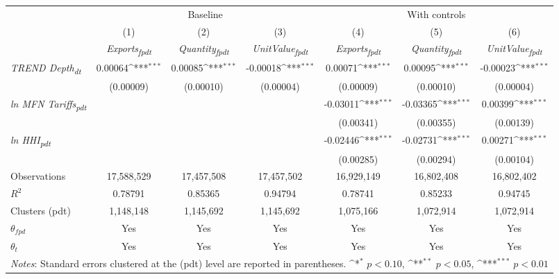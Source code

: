 {
\def\sym#1{\ifmmode^{#1}\else\(^{#1}\)\fi}
\begin{tabular}{l*{6}{c}}
\toprule
&\multicolumn{3}{c}{Baseline}&\multicolumn{3}{c}{With controls}\\\cmidrule(lr){2-4}\cmidrule(lr){5-7}
&(1)&(2)&(3)&(4)&(5)&(6)\\
&\textit{Exports\textsubscript{fpdt}}&\textit{Quantity\textsubscript{fpdt}}&\textit{UnitValue\textsubscript{fpdt}}&\textit{Exports\textsubscript{fpdt}}&\textit{Quantity\textsubscript{fpdt}}&\textit{UnitValue\textsubscript{fpdt}}\\
\midrule
\textit{TREND Depth\textsubscript{dt}} & 0.00064\sym{***} & 0.00085\sym{***} & -0.00018\sym{***} & 0.00071\sym{***} & 0.00095\sym{***} & -0.00023\sym{***}\\
 & (0.00009) & (0.00010) & (0.00004) & (0.00009) & (0.00010) & (0.00004)\\
\addlinespace
\textit{ln MFN Tariffs\textsubscript{pdt}} &  &  &  & -0.03011\sym{***} & -0.03365\sym{***} & 0.00399\sym{***}\\
 &  &  &  & (0.00341) & (0.00355) & (0.00139)\\
\addlinespace
\textit{ln HHI\textsubscript{pdt}} &  &  &  & -0.02446\sym{***} & -0.02731\sym{***} & 0.00271\sym{***}\\
 &  &  &  & (0.00285) & (0.00294) & (0.00104)\\
\midrule
Observations & 17,588,529 & 17,457,508 & 17,457,502 & 16,929,149 & 16,802,408 & 16,802,402\\
$R^{2}$ & 0.78791 & 0.85365 & 0.94794 & 0.78741 & 0.85233 & 0.94745\\
Clusters (pdt) & 1,148,148 & 1,145,692 & 1,145,692 & 1,075,166 & 1,072,914 & 1,072,914\\
$\theta_{fpd}$ & Yes & Yes & Yes & Yes & Yes & Yes\\
$\theta_{t}$ & Yes & Yes & Yes & Yes & Yes & Yes\\
\bottomrule
\multicolumn{7}{l}{\footnotesize \textit{Notes}: Standard errors clustered at the (pdt) level are reported in parentheses. \sym{*} \(p<0.10\), \sym{**} \(p<0.05\), \sym{***} \(p<0.01\)}\\
\end{tabular}
}

